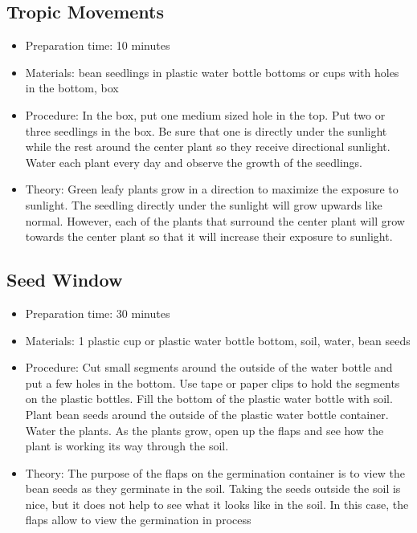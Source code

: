 \subsection{Tropic Movements}
\begin{itemize}
\item{Preparation time: 10 minutes}
\item{Materials: bean seedlings in plastic water bottle bottoms or cups with holes in the bottom, box}
\item{Procedure: In the box, put one medium sized hole in the top. Put two or three seedlings in the box. Be sure that one is directly under the sunlight while the rest around the center plant so they receive directional sunlight. Water each plant every day and observe the growth of the seedlings.}
\item{Theory: Green leafy plants grow in a direction to maximize the exposure to sunlight. The seedling directly under the sunlight will grow upwards like normal. However, each of the plants that surround the center plant will grow towards the center plant so that it will increase their exposure to sunlight. }
\end{itemize}

\subsection{Seed Window}
\begin{itemize}
\item{Preparation time: 30 minutes}
\item{Materials: 1 plastic cup or plastic water bottle bottom, soil, water, bean seeds}
\item{Procedure: Cut small segments around the outside of the water bottle and put a few holes in the bottom. Use tape or paper clips to hold the segments on the plastic bottles. Fill the bottom of the plastic water bottle with soil. Plant bean seeds around the outside of the plastic water bottle container. Water the plants. As the plants grow, open up the flaps and see how the plant is working its way through the soil.}
\item{Theory: The purpose of the flaps on the germination container is to view the bean seeds as they germinate in the soil. Taking the seeds outside the soil is nice, but it does not help to see what it looks like in the soil. In this case, the flaps allow to view the germination in process}
\end{itemize}


